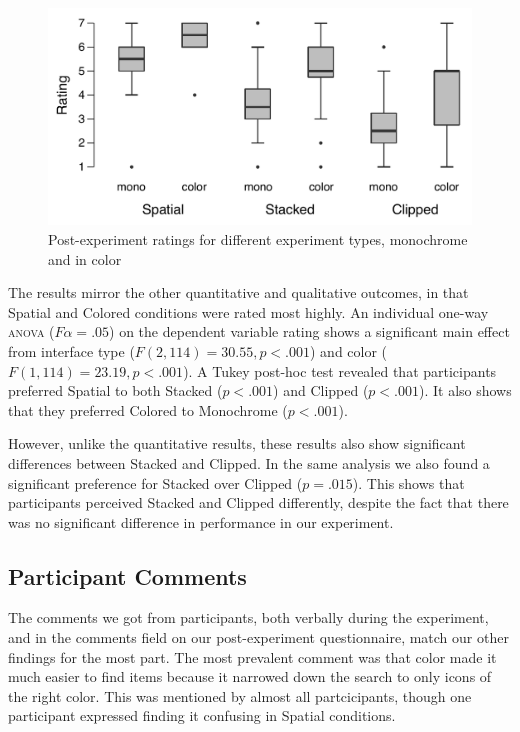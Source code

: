 \documentclass[nobib]{tufte-book} %
\begin{document}
\begin{figure}
  \includegraphics{post-color.pdf}
  \caption{Post-experiment ratings for different experiment types, monochrome and in color}
  \label{fig:post-color}
\end{figure}

The results mirror the other quantitative and qualitative outcomes, in that Spatial and Colored conditions were rated most highly. An individual one-way \textsc{anova} ($F\alpha = .05$) on the dependent variable rating shows a significant main effect from interface type ($F(2,114) = 30.55, p < .001$) and color ($F(1,114) = 23.19, p < .001$). A Tukey post-hoc test revealed that participants preferred Spatial to both Stacked ($p < .001$) and Clipped ($p < .001$). It also shows that they preferred Colored to Monochrome ($p < .001$).

However, unlike the quantitative results, these results also show significant differences between Stacked and Clipped. In the same analysis we also found a significant preference for Stacked over Clipped ($p = .015$). This shows that participants perceived Stacked and Clipped differently, despite the fact that there was no significant difference in performance in our experiment.

\subsection{Participant Comments}
The comments we got from participants, both verbally during the experiment, and in the comments field on our post-experiment questionnaire, match our other findings for the most part. The most prevalent comment was that color made it much easier to find items because it narrowed down the search to only icons of the right color. This was mentioned by almost all partcicipants, though one participant expressed finding it confusing in Spatial conditions.
\end{document}
